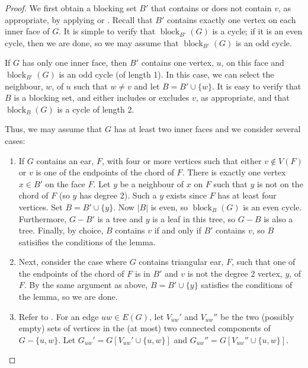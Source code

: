 \documentclass{patmorin}
\DeclareMathOperator{\block}{block}
\begin{document}
\begin{proof}
  We first obtain a blocking set $B'$ that contains or does not
  contain $v$, as appropriate, by applying  or
  . Recall that $B'$ contains exactly one vertex
  on each inner face of $G$.  It is simple to verify that $\block_{B'}(G)$
  is a cycle;  if it is an even cycle, then we are done, so we may assume
  that $\block_{B'}(G)$ is an odd cycle.

  If $G$ has only one inner face, then $B'$ contains one vertex,
  $u$, on this face and $\block_{B'}(G)$ is an odd cycle (of length 1).
  In this case, we can select the neighbour, $w$, of $u$ such that
  $w\neq v$ and let $B=B'\cup\{w\}$.  It is easy to verify that $B$ is
  a blocking set, and either includes or excludes $v$, as appropriate,
  and that $\block_B(G)$ is a cycle of length 2.

  Thus, we may assume that $G$ has at least two inner faces and we
  consider several cases:
 
  \begin{enumerate}
  \item If $G$ contains an ear, $F$, with four or more vertices such that
  either $v\not\in V(F)$ or $v$ is one of the endpoints of the chord of
  $F$. There is exactly one vertex $x\in B'$ on the face $F$.  Let $y$
  be a neighbour of $x$ on $F$ such that $y$ is not on the chord of $F$
  (so $y$ has degree 2). Such a $y$ exists since $F$ has at least four
  vertices.  Set $B=B'\cup \{y\}$.  Now $|B|$ is even, so $\block_B(G)$
  is an even cycle.  Furthermore, $G-B'$ is a tree and $y$ is a leaf in
  this tree, so $G-B$ is also a tree.  Finally, by choice, $B$ contains
  $v$ if and only if $B'$ contains $v$, so $B$ satisifies the conditions
  of the lemma.

  \item Next, consider the case where $G$ contains triangular ear, $F$,
  such that one of the endpoints of the chord of $F$ is in $B'$ and $v$
  is not the degree 2 vertex, $y$, of $F$.  By the same argument as above,
  $B=B'\cup\{y\}$ satisfies the conditions of the lemma, so we are done.

  \item Refer to .  For an edge $uw\in E(G)$, let
  $V_{uw}'$ and $V_{uw}''$ be the two (possibly empty) sets of vertices
  in the (at most) two connected components of $G-\{u,w\}$.  Let
  $G_{uw}'=G[V_{uw}'\cup\{u,w\}]$ and $G_{uw}''=G[V_{uw}''\cup\{u,w\}]$.


\end{enumerate}
\end{proof}
\end{document}
